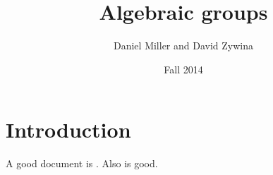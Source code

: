 \documentclass[oneside]{article}
\title{Algebraic groups}
\author{Daniel Miller and David Zywina}
\date{Fall 2014}
\begin{document}
\fontsize{10.5}{12.6} %
\selectfont

\maketitle
\tableofcontents


\section{Introduction}

A good document is \cite{hartshorne-1977}. Also \cite{sga3} is good. 


\printbibliography
\end{document}
